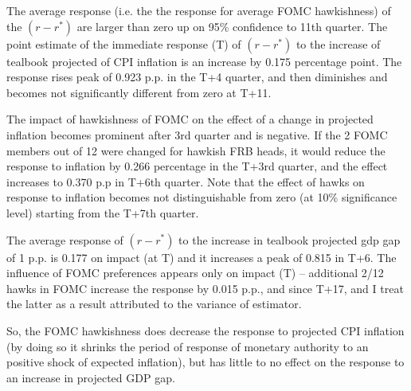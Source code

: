 \documentclass[11pt]{article}
\begin{document}
The average response (i.e. the the response for average FOMC hawkishness) of the $\left(r-r^*\right)$ are larger than zero up on 95\% confidence to 11th quarter. The point estimate of the immediate response (T) of $\left(r-r^*\right)$ to the increase of tealbook projected of CPI inflation is an increase by 0.175 percentage point. The response rises peak of 0.923 p.p. in the T+4 quarter, and then diminishes and becomes not significantly different from zero at T+11.


The impact of hawkishness of FOMC on the effect of a change in projected inflation becomes prominent after 3rd quarter and is negative. If the 2 FOMC members out of 12 were changed for hawkish FRB heads, it would reduce the response to inflation by 0.266 percentage in the T+3rd quarter, and the effect increases to 0.370 p.p in T+6th quarter. 
Note that the effect of hawks on response to inflation becomes not distinguishable from zero (at 10\% significance level) starting from the T+7th quarter.

The average response of $\left(r-r^*\right)$ to the increase in tealbook projected gdp gap of 1 p.p. is 0.177 on impact (at T) and it increases a peak of 0.815 in T+6. The influence of FOMC preferences appears only on impact (T) -- additional 2/12 hawks in FOMC increase the response by 0.015 p.p., and since T+17, and I treat the latter as a result attributed to the variance of estimator. 

So, the FOMC hawkishness does decrease the response to projected CPI inflation (by doing so it shrinks the period of response of monetary authority to an positive shock of expected inflation), but has little to no effect on the response to an increase in projected GDP gap.
\end{document}
